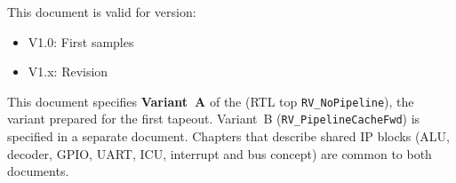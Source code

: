 This document is valid for \aschip \; version:
\begin{itemize}
  \item V1.0: First samples
  \item V1.x: Revision
\end{itemize}

This document specifies \textbf{Variant~A} of the \aschip{} (RTL top
\texttt{RV\_NoPipeline}), the variant prepared for the first tapeout.
Variant~B (\texttt{RV\_PipelineCacheFwd}) is specified in a separate document.
Chapters that describe shared IP blocks (ALU, decoder, GPIO, UART, ICU,
interrupt and bus concept) are common to both documents.
